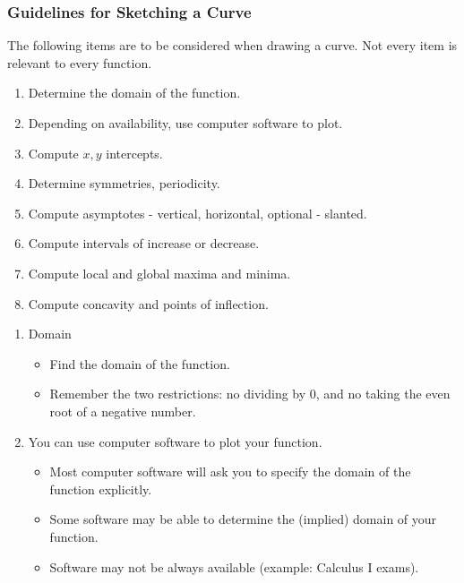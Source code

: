 \begin{frame}
\frametitle{Guidelines for Sketching a Curve}
The following items are to be considered when drawing a curve. \alert<2>{Not every item is relevant to every function.}
\begin{enumerate}
\item  Determine the domain of the function.
\item  Depending on availability, use computer software to plot.
\item  \alert<2>{Compute $x,y$ intercepts.}
\item  \alert<2>{Determine symmetries, periodicity.}
\item  \alert<2>{Compute asymptotes - vertical, horizontal, {\color{gray} optional - slanted}.}
\item  Compute intervals of increase or decrease.
\item  Compute local and global maxima and minima.
\item  Compute concavity and points of inflection.
\end{enumerate}
\end{frame}

\begin{frame}[t]
\begin{enumerate}
\item  \alert<3>{Domain}
\begin{itemize}
\item  Find the domain of the function.
\item  Remember the two restrictions: no dividing by $0$, and no taking the even root of a negative number.
\end{itemize}
\item<2-> You can use computer software to plot your function.
\begin{itemize}
\item<3-> Most computer software will ask you to specify the \alert<3>{domain of the function} explicitly.
\item<4-> Some software may be able to determine the (implied) domain of your function.
\item<5-> Software may not be always available (example: Calculus I exams).
\end{itemize}
\end{enumerate}
\end{frame}


